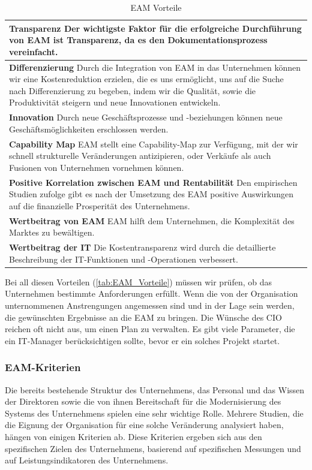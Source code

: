 \documentclass[doc]{apa6}
\begin{document}
\begin{table}[!htbp]
\caption{EAM Vorteile}
\begin{center}
\begin{tabularx}{\textwidth}{|X|}
\hline
\textbf{Transparenz} Der wichtigste Faktor für die erfolgreiche Durchführung von EAM ist Transparenz, da es den Dokumentationsprozess vereinfacht.
\\\hline
\textbf{Differenzierung} Durch die Integration von EAM in das Unternehmen können wir eine Kostenreduktion erzielen, die es uns ermöglicht, uns auf die Suche nach Differenzierung zu begeben, indem wir die Qualität, sowie die Produktivität steigern und neue Innovationen entwickeln.
\\\hline
\textbf{Innovation} Durch neue Geschäftsprozesse und  -beziehungen können neue Geschäftsmöglichkeiten erschlossen werden.
\\\hline
\textbf{Capability Map} EAM stellt eine Capability-Map zur Verfügung, mit der wir schnell strukturelle Veränderungen antizipieren, oder Verkäufe als auch Fusionen von Unternehmen vornehmen können.
\\\hline
\textbf{Positive Korrelation zwischen EAM und Rentabilität} Den empirischen Studien zufolge gibt es nach der Umsetzung des EAM positive Auswirkungen auf die finanzielle Prosperität des Unternehmens.
\\\hline
\textbf{Wertbeitrag von EAM} EAM hilft dem Unternehmen, die Komplexität des Marktes zu bewältigen.
\\\hline
\textbf{Wertbeitrag der IT} Die Kostentransparenz wird durch die detaillierte Beschreibung der IT-Funktionen und -Operationen verbessert.
\\\hline
\end{tabularx}
\end{center}
\label{tab:EAM_Vorteile}
\end{table}%

Bei all diesen Vorteilen (\autoref{tab:EAM_Vorteile}) müssen wir prüfen, ob das Unternehmen bestimmte Anforderungen erfüllt. Wenn die von der Organisation unternommenen Anstrengungen angemessen sind und in der Lage sein werden, die gewünschten Ergebnisse an die EAM zu bringen. Die Wünsche des CIO reichen oft nicht aus, um einen Plan zu verwalten. Es gibt viele Parameter, die ein IT-Manager berücksichtigen sollte, bevor er ein solches Projekt startet.

\subsubsection{EAM-Kriterien}
Die bereits bestehende Struktur des Unternehmens, das Personal und das Wissen der Direktoren sowie die von ihnen Bereitschaft für die Modernisierung des Systems des Unternehmens spielen eine sehr wichtige Rolle. Mehrere Studien, die die Eignung der Organisation für eine solche Veränderung analysiert haben, hängen von einigen Kriterien ab. Diese Kriterien ergeben sich aus den spezifischen Zielen des Unternehmens, basierend auf spezifischen Messungen und auf Leistungsindikatoren des Unternehmens.
\end{document}
